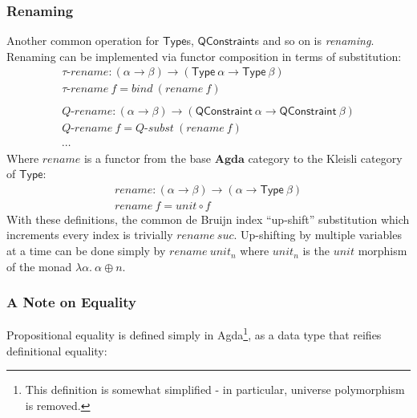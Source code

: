 \documentclass[a4paper]{jfp}
\begin{document}
\subsubsection{Renaming}

Another common operation for $\textsf{Type}$s, $\textsf{QConstraint}$s and so on is \emph{renaming}. Renaming can be implemented via functor
composition in terms of substitution:
\begin{displaymath}
   \begin{array}{l}
      \textit{$\tau$-rename} : (\alpha \rightarrow \beta) \rightarrow (\textsf{Type}\ \alpha \rightarrow \textsf{Type}\ \beta) \\
      \textit{$\tau$-rename}\ f = \mathit{bind}\ (\mathit{rename}\ f) \\ \\ 
      \textit{Q-rename} : (\alpha \rightarrow \beta) \rightarrow (\textsf{QConstraint}\ \alpha \rightarrow \textsf{QConstraint}\ \beta) \\
      \textit{Q-rename}\ f = \textit{Q-subst}\ (\mathit{rename}\ f) \\  \\ 
      \cdots
   \end{array}
\end{displaymath}
Where $\mathit{rename}$ is a functor from the base $\textbf{Agda}$ category to the Kleisli category of $\textsf{Type}$:
\begin{displaymath}
   \begin{array}{l}
      \textit{rename} : (\alpha \rightarrow \beta) \rightarrow (\alpha \rightarrow \textsf{Type}\ \beta) \\
      \textit{rename}\ f = \mathit{unit} \circ f
   \end{array}
\end{displaymath}
\nopagebreak
With these definitions, the common de Bruijn index ``up-shift'' substitution which increments every index is trivially $\mathit{rename}\
\mathit{suc}$. Up-shifting by multiple variables at a time can be done simply by $\mathit{rename}\ \mathit{unit}_n$ where $\mathit{unit}_n$ is the
$\mathit{unit}$ morphism of the monad $\lambda \alpha.\ \alpha \oplus n$. 

\subsubsection{A Note on Equality}

Propositional equality is defined simply in Agda\footnote{This definition is somewhat simplified - in particular, universe polymorphism is removed.},
as a data type that reifies definitional equality:
\end{document}
